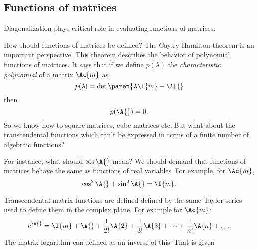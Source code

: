 \subsection{Functions of matrices}

Diagonalization plays critical role in evaluating functions of matrices.\cite{Higham2008}

How should functions of matrices be defined? The Cayley-Hamilton theorem\cite[p. 509]{Meyer2000} is an important perspective. This theorem describes the behavior of polynomial functions of matrices. It says that if we define $p(\lambda)$ the \emph{characteristic polynomial} of a matrix $\Ac{m}$ as 
\begin{equation}
  p(\lambda) = \det \paren{\lambda \I{m} - \A{}}
\end{equation}
then 
\begin{equation}
  p( \A{} ) = 0.
\end{equation}
So we know how to square matrices, cube matrices etc. But what about the transcendental functions which can't be expressed in terms of a finite number of algebraic functions?

For instance, what should $\cos \A{}$ mean? We should demand that functions of matrices behave the same as functions of real variables. For example, for $\Ac{m}$,
\begin{equation}
  \cos^{2}\A{} + \sin^{2}\A{} = \I{m}.
\end{equation}

Transcendental matrix functions are defined defined by the same Taylor series used to define them in the complex plane. For example for $\Ac{m}$:
\begin{equation}
  e^{\A{}} = \I{m} + \A{} + \frac{1}{2!}\A{2} + \frac{1}{3!}\A{3} + \dots + \frac{1}{n!}\A{n} + \dots
\end{equation}
The matrix logarithm can defined as an inverse of this. That is given 

\endinput